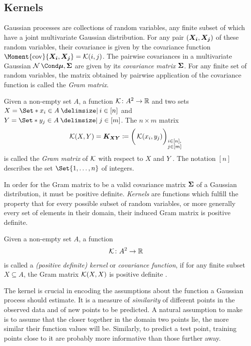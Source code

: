 \subsection{Kernels}
Gaussian processes are collections of random variables, any finite subset of which have a joint multivariate Gaussian distribution.
For any pair $(\bm{X_i}, \bm{X_j})$ of these random variables, their covariance is given by the covariance function $\Moment{\cov}{\rv{X_i}, \rv{X_j}} = \K(i, j)$.
The pairwise covariances in a multivariate Gaussian $\Gaussian{\mat{\mu}, \mat{\Sigma}}$ are given by its \emph{covariance matrix} $\bm{\Sigma}$.
For any finite set of random variables, the matrix obtained by pairwise application of the covariance function is called the \emph{Gram matrix}.
\begin{definition}
    Given a non-empty set $A$, a function $\operatorname{\mathcal{K}} \colon A^2 \to \mathbb{R}$ and two sets $X = \Set*{x_i \in A \with i \in [n]}$ and $Y = \Set*{y_j \in A \with j \in [m]}$.
    The $n \times m$ matrix
    \begin{align}
        \operatorname{\mathcal{K}}(X, Y) = \bm{K_{XY}} \coloneqq \bigg( \operatorname{\mathcal{K}}(x_i, y_j) \bigg)_{\substack{i \in [n], \\ j \in [m]}}
    \end{align}
    is called the \emph{Gram matrix} of $\operatorname{\mathcal{K}}$ with respect to $X$ and $Y$ \cite{scholkopf_learning_2002}.
    The notation $[n]$ describes the set $\Set{1, \dots, n}$ of integers.
\end{definition}
In order for the Gram matrix to be a valid covariance matrix $\bm{\Sigma}$ of a Gaussian distribution, it must be positive definite.
\emph{Kernels} are functions which fulfill the property that for every possible subset of random variables, or more generally every set of elements in their domain, their induced Gram matrix is positive definite.
\begin{definition}[Kernel]
    Given a non-empty set $A$, a function
    \begin{align}
        \operatorname{\mathcal{K}} \colon A^2 \to \mathbb{R}
    \end{align}
    is called a \emph{(positive definite) kernel} or \emph{covariance function}, if for any finite subset $X \subseteq A$, the Gram matrix $\operatorname{\mathcal{K}}(X, X)$ is positive definite \cite{scholkopf_learning_2002}.
\end{definition}
The kernel is crucial in encoding the assumptions about the function a Gaussian process should estimate.
It is a measure of \emph{similarity} of different points in the observed data and of new points to be predicted.
A natural assumption to make is to assume that the closer together in the domain two points lie, the more similar their function values will be.
Similarly, to predict a test point, training points close to it are probably more informative than those further away.

